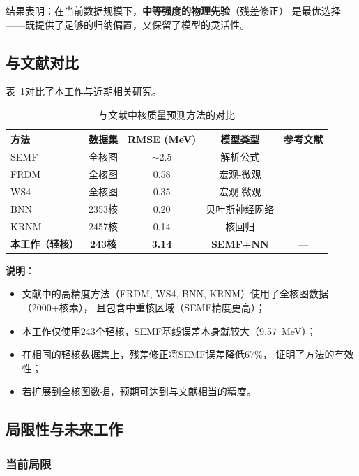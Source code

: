 \documentclass[12pt, a4paper]{article}
\begin{document}
结果表明：在当前数据规模下，\textbf{中等强度的物理先验}（残差修正）
是最优选择——既提供了足够的归纳偏置，又保留了模型的灵活性。

\subsection{与文献对比}

表~\ref{tab:literature}对比了本工作与近期相关研究。

\begin{table}[htbp]
  \centering
  \caption{与文献中核质量预测方法的对比}
  \label{tab:literature}
  \begin{tabular}{lcccc}
    \toprule
    \textbf{方法} & \textbf{数据集} & \textbf{RMSE (MeV)} & \textbf{模型类型} & \textbf{参考文献} \\
    \midrule
    SEMF & 全核图 & $\sim$2.5 & 解析公式 & \cite{weizsacker1935} \\
    FRDM & 全核图 & 0.58 & 宏观-微观 & \cite{moller2016frdm} \\
    WS4 & 全核图 & 0.35 & 宏观-微观 & \cite{wang2014ws4} \\
    \midrule
    BNN & 2353核 & 0.20 & 贝叶斯神经网络 & \cite{niu2018bnn} \\
    KRNM & 2457核 & 0.14 & 核回归 & \cite{utama2016krnm} \\
    \midrule
    \textbf{本工作（轻核）} & \textbf{243核} & \textbf{3.14} & \textbf{SEMF+NN} & --- \\
    \bottomrule
  \end{tabular}
\end{table}

\textbf{说明}：
\begin{itemize}
  \item 文献中的高精度方法（FRDM, WS4, BNN, KRNM）使用了全核图数据（2000+核素），
        且包含中重核区域（SEMF精度更高）；
  \item 本工作仅使用243个轻核，SEMF基线误差本身就较大（9.57~MeV）；
  \item 在相同的轻核数据集上，残差修正将SEMF误差降低67\%，
        证明了方法的有效性；
  \item 若扩展到全核图数据，预期可达到与文献相当的精度。
\end{itemize}

\subsection{局限性与未来工作}

\subsubsection{当前局限}
\end{document}

